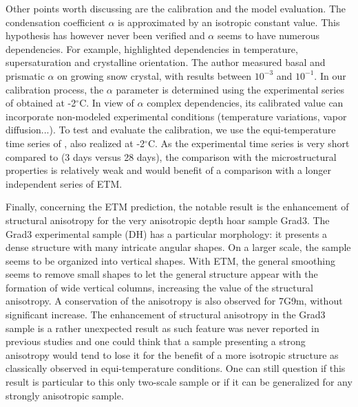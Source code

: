 \documentclass[draft,ms]{agujournal2019}
\begin{document}
Other points worth discussing are the calibration and the model evaluation. The condensation coefficient $\alpha$ is approximated by an isotropic constant value. This hypothesis has however never been verified and $\alpha$ seems to have numerous dependencies. For example,  highlighted dependencies in temperature, supersaturation and crystalline orientation. The author measured basal and prismatic $\alpha$ on growing snow crystal, with results between $10^{-3}$ and $10^{-1}$.
In our calibration process, the $\alpha$ parameter is determined using the experimental series of  obtained at -2$^\circ$C. In view of $\alpha$ complex dependencies, its calibrated value can incorporate non-modeled experimental conditions (temperature variations, vapor diffusion...).
To test and evaluate the calibration, we use the equi-temperature time series of , also realized at -2$^\circ$C. As the experimental time series is very short compared to  (3 days versus 28 days), the comparison with the microstructural properties is relatively weak and would benefit of a comparison with a longer independent series of ETM. 

Finally, concerning the ETM prediction, the notable result is the enhancement of structural anisotropy for the very anisotropic depth hoar sample Grad3. The Grad3 experimental sample (DH) has a particular morphology: it presents a dense structure with many intricate angular shapes. On a larger scale, the sample seems to be organized into vertical shapes. With ETM, the general smoothing seems to remove small shapes to let the general structure appear with the formation of wide vertical columns, increasing the value of the structural anisotropy. A conservation of the anisotropy is also observed for 7G9m, without significant increase. The enhancement of structural anisotropy in the Grad3 sample is a rather unexpected result as such feature was never reported in previous studies and one could think that a sample presenting a strong anisotropy would tend to lose it for the benefit of a more isotropic structure as classically observed in equi-temperature conditions. One can still question if this result is particular to this only two-scale sample or if it can be generalized for any strongly anisotropic sample. 
\end{document}
